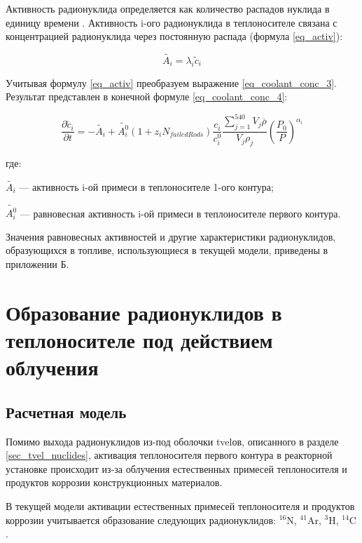 Активность радионуклида определяется как количество распадов нуклида в единицу времени \cite{gusev_def}. Активность 
i-ого радионуклида в теплоносителе связана с концентрацией радионуклида через постоянную распада (формула 
\ref{eq_activ}):

\begin{equation}
    \label{eq_activ}
    \widetilde{A_{i}} = \lambda_{i} \widetilde{c}_{i}
\end{equation}

Учитывая формулу \ref{eq_activ} преобразуем выражение \ref{eq_coolant_conc_3}. Результат представлен в конечной формуле 
\ref{eq_coolant_conc_4}:

\begin{equation}
    \label{eq_coolant_conc_4}
    \frac{\partial \widetilde{c}_{i}}{\partial t} = -\widetilde{A_{i}} + \widetilde{A_{i}^{0}}
        (1 + z_{i}N_{failedRods})\frac{c_{i}}{c_{i}^{0}}\frac{\sum_{j=1}^{540} V_{j}\overline{\rho}}{V_{j}\rho_{j}}
        (\frac{P_{0}}{P})^{\alpha_{i}}
\end{equation}

где:
\begin{description}
    \item $\widetilde{A_{i}}$ --- активность i-ой примеси в теплоносителе 1-ого контура;
    \item $\widetilde{A_{i}^{0}}$ --- равновесная активность i-ой примеси в теплоносителе первого контура.
\end{description}

Значения равновесных активностей и другие характеристики радионуклидов, образующихся в топливе, использующиеся в 
текущей модели, приведены в приложении Б.

\section{Образование радионуклидов в теплоносителе под действием облучения}

\subsection{Расчетная модель}

Помимо выхода радионуклидов из-под оболочки \ac{tvel}ов, описанного в разделе \ref{sec_tvel_nuclides}, активация 
теплоносителя первого контура в реакторной установке происходит из-за облучения естественных примесей теплоносителя и 
продуктов коррозии конструкционных материалов. 

В текущей модели активации естественных примесей теплоносителя и продуктов коррозии учитывается образование следующих 
радионуклидов: $^{16}\text{N}$, $^{41}\text{Ar}$, $^{3}\text{H}$, $^{14}\text{C}$.

